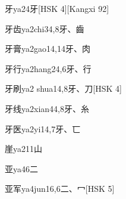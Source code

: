 \begin{EntryWithPhonetic}{牙}{ya2}{4}{⽛}[HSK 4][Kangxi 92]
\end{EntryWithPhonetic}

\begin{EntryWithPhonetic}{牙齿}{ya2chi3}{4,8}{⽛、⿒}
\end{EntryWithPhonetic}

\begin{EntryWithPhonetic}{牙膏}{ya2gao1}{4,14}{⽛、⾁}
\end{EntryWithPhonetic}

\begin{EntryWithPhonetic}{牙行}{ya2hang2}{4,6}{⽛、⾏}
\end{EntryWithPhonetic}

\begin{EntryWithPhonetic}{牙刷}{ya2 shua1}{4,8}{⽛、⼑}[HSK 4]
\end{EntryWithPhonetic}

\begin{EntryWithPhonetic}{牙线}{ya2xian4}{4,8}{⽛、⽷}
\end{EntryWithPhonetic}

\begin{EntryWithPhonetic}{牙医}{ya2yi1}{4,7}{⽛、⼖}
\end{EntryWithPhonetic}

\begin{EntryWithPhonetic}{崖}{ya2}{11}{⼭}
\end{EntryWithPhonetic}

\begin{EntryWithPhonetic}{亚}{ya4}{6}{⼆}
\end{EntryWithPhonetic}

\begin{EntryWithPhonetic}{亚军}{ya4jun1}{6,6}{⼆、⼍}[HSK 5]
\end{EntryWithPhonetic}

